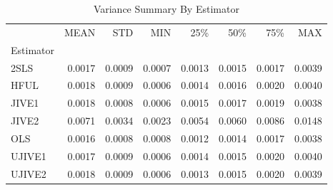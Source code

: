 \begin{table}[ht]
\centering
\caption{Variance Summary By Estimator}
\begin{tabular}{lrrrrrrr}
\toprule
 & MEAN & STD & MIN & 25\% & 50\% & 75\% & MAX \\
Estimator &  &  &  &  &  &  &  \\
\midrule
2SLS & 0.0017 & 0.0009 & 0.0007 & 0.0013 & 0.0015 & 0.0017 & 0.0039 \\
HFUL & 0.0018 & 0.0009 & 0.0006 & 0.0014 & 0.0016 & 0.0020 & 0.0040 \\
JIVE1 & 0.0018 & 0.0008 & 0.0006 & 0.0015 & 0.0017 & 0.0019 & 0.0038 \\
JIVE2 & 0.0071 & 0.0034 & 0.0023 & 0.0054 & 0.0060 & 0.0086 & 0.0148 \\
OLS & 0.0016 & 0.0008 & 0.0008 & 0.0012 & 0.0014 & 0.0017 & 0.0038 \\
UJIVE1 & 0.0017 & 0.0009 & 0.0006 & 0.0014 & 0.0015 & 0.0020 & 0.0040 \\
UJIVE2 & 0.0018 & 0.0009 & 0.0006 & 0.0013 & 0.0015 & 0.0020 & 0.0039 \\
\bottomrule
\end{tabular}
\end{table}
